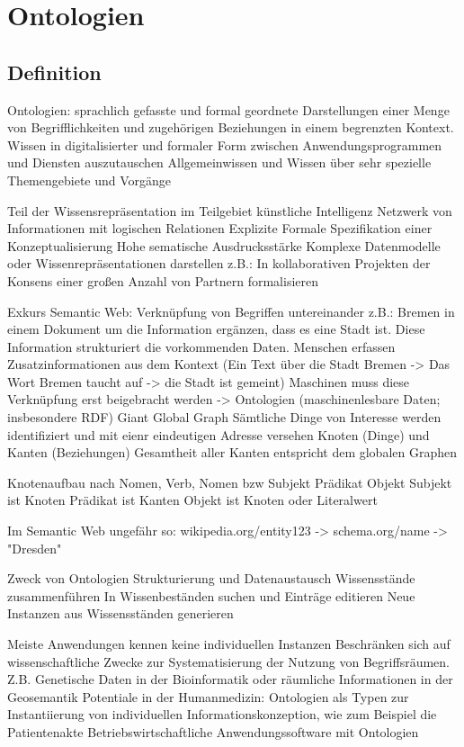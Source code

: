 \chapter{Ontologien}
\section{Definition}
Ontologien: 
	sprachlich gefasste und formal geordnete Darstellungen einer Menge von Begrifflichkeiten und zugehörigen Beziehungen in einem begrenzten Kontext. 
	Wissen in digitalisierter und formaler Form zwischen Anwendungsprogrammen und Diensten auszutauschen
	Allgemeinwissen und Wissen über sehr spezielle Themengebiete und Vorgänge
	
	Teil der Wissensrepräsentation im Teilgebiet künstliche Intelligenz
	Netzwerk von Informationen mit logischen Relationen
	Explizite Formale Spezifikation einer Konzeptualisierung
	Hohe sematische Ausdrucksstärke
		Komplexe Datenmodelle oder Wissenrepräsentationen darstellen
		z.B.: In kollaborativen Projekten der Konsens einer großen Anzahl von Partnern formalisieren
		
		
Exkurs Semantic Web:
	Verknüpfung von Begriffen untereinander
		z.B.: Bremen in einem Dokument um die Information ergänzen, dass es eine Stadt ist. Diese Information strukturiert die vorkommenden Daten. 
		Menschen erfassen Zusatzinformationen aus dem Kontext (Ein Text über die Stadt Bremen -> Das Wort Bremen taucht auf -> die Stadt ist gemeint)
		Maschinen muss diese Verknüpfung erst beigebracht werden -> Ontologien (maschinenlesbare Daten; insbesondere RDF)
	Giant Global Graph
		Sämtliche Dinge von Interesse werden identifiziert und mit eienr eindeutigen Adresse versehen
		Knoten (Dinge) und Kanten (Beziehungen) 
		Gesamtheit aller Kanten entspricht dem globalen Graphen
		
		
	Knotenaufbau nach Nomen, Verb, Nomen bzw Subjekt Prädikat Objekt
	Subjekt ist Knoten
	Prädikat ist Kanten
	Objekt ist Knoten oder Literalwert
	
		Im Semantic Web ungefähr so:
			wikipedia.org/entity123 -> schema.org/name -> "Dresden"
			
	
Zweck von Ontologien
	Strukturierung und Datenaustausch
	Wissensstände zusammenführen
	In Wissenbeständen suchen und Einträge editieren
	Neue Instanzen aus Wissensständen generieren
	
	Meiste Anwendungen kennen keine individuellen Instanzen 
	Beschränken sich auf wissenschaftliche Zwecke zur Systematisierung der Nutzung von Begriffsräumen. Z.B. Genetische Daten in der Bioinformatik oder räumliche Informationen in der Geosemantik
	Potentiale in der Humanmedizin: Ontologien als Typen zur Instantiierung von individuellen Informationskonzeption, wie zum Beispiel die Patientenakte
	Betriebswirtschaftliche Anwendungssoftware mit Ontologien
	
